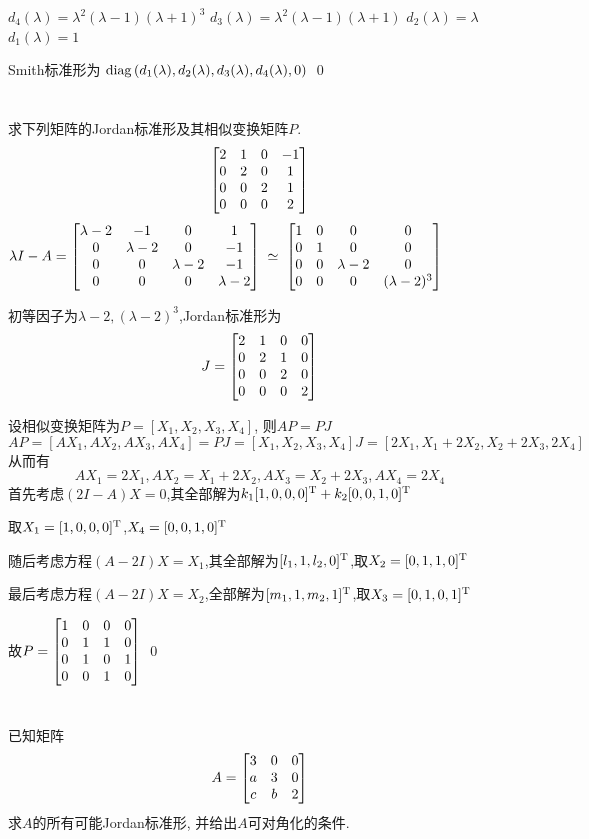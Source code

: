 \documentclass{matrix-homework}
\newcommand{\la}{\lambda}
\newcommand{\simeqstep}[1]{\;\overset{#1}{\simeq}\;}
\begin{document}
\answer
$d_4(\la) = \la^2(\la-1)(\la+1)^3$ \qquad
$d_3(\la) = \la^2(\la-1)(\la+1)$ \qquad
$d_2(\la) = \la$ \qquad
$d_1(\la) = 1$

Smith标准形为
$\mr{diag}\left(d_1(\la),d_2(\la),d_3(\la),d_4(\la),0\right)$
\qed

\newpage
\section{}
求下列矩阵的Jordan标准形及其相似变换矩阵$P$.
$$\begin{bmatrix}2 & 1 & 0 & -1 \\ 0 & 2 & 0 & 1 \\ 0 & 0& 2 & 1 \\ 0 & 0 & 0 & 2\end{bmatrix}$$
\answer
$
    \la I - A =
    \mat{\la-2 & -1 & 0 & 1 \\
        0 & \la-2 & 0 & -1 \\
        0 & 0 & \la-2 & -1 \\
        0 & 0 & 0 & \la-2}
    \simeqstep{}
    \mat{1 & 0 & 0 & 0 \\
        0 & 1 & 0 & 0 \\
        0 & 0 & \la-2 & 0 \\
        0 & 0 & 0 & (\la-2)^3}
$

初等因子为$\la-2,(\la-2)^3$,Jordan标准形为
$$J = \begin{bmatrix}2 & 1 & 0 & 0 \\ 0 & 2 & 1 & 0 \\ 0 & 0 & 2 & 0 \\ 0 & 0 & 0 & 2\end{bmatrix}$$

设相似变换矩阵为$P=[X_1,X_2,X_3,X_4]$, 则$AP=PJ$
$$AP=[AX_1,AX_2,AX_3,AX_4]=PJ=[X_1,X_2,X_3,X_4]J=[2X_1,X_1+2X_2,X_2+2X_3,2X_4]$$
从而有
$$AX_1=2X_1,AX_2=X_1+2X_2,AX_3=X_2+2X_3,AX_4=2X_4$$
首先考虑$(2I-A)X=0$,其全部解为$k_1[1,0,0,0]^{\mathrm{T}}+k_2[0,0,1,0]^{\mathrm{T}}$

取$X_1=[1,0,0,0]^{\mathrm{T}}$,$X_4=[0,0,1,0]^{\mathrm{T}}$

随后考虑方程$(A-2I)X=X_1$,其全部解为$[l_1,1,l_2,0]^{\mathrm{T}}$,取$X_2=[0,1,1,0]^{\mathrm{T}}$

最后考虑方程$(A-2I)X=X_2$,全部解为$[m_1,1,m_2,1]^{\mathrm{T}}$,取$X_3=[0,1,0,1]^{\mathrm{T}}$

故$P=\begin{bmatrix}1 & 0 & 0 & 0 \\ 0 & 1 & 1 & 0 \\ 0 & 1 & 0 & 1 \\ 0 & 0 & 1 & 0\end{bmatrix}$
\qed

\newpage
\section{}
已知矩阵$$A=\begin{bmatrix}3 & 0 & 0 \\ a & 3 & 0 \\ c & b & 2\end{bmatrix}$$求$A$的所有可能Jordan标准形, 并给出$A$可对角化的条件.
\end{document}

